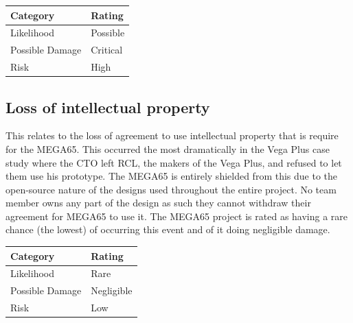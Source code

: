 \begin{tabular}{l|l} %
    	\textbf{Category} 	&	\textbf{Rating} \\
      \hline
     Likelihood			&	Possible \\
     Possible Damage 	& 	Critical \\
     Risk 				&	High		\\	
    \end{tabular}


\subsection{Loss of intellectual property}
This relates to the loss of agreement to use intellectual property that is require for the MEGA65. This occurred the most dramatically in the Vega Plus case study where the CTO left RCL, the makers of the Vega Plus, and refused to let them use his prototype. The MEGA65 is entirely shielded from this due to the open-source nature of the designs used throughout the entire project. No team member owns any part of the design as such they cannot withdraw their agreement for MEGA65 to use it. The MEGA65 project is rated as having a rare chance (the lowest) of occurring this event and of it doing negligible damage.  \\

\begin{tabular}{l|l} %
    	\textbf{Category} 	&	\textbf{Rating} \\
      \hline
     Likelihood			&	Rare \\
     Possible Damage 	& 	Negligible \\
     Risk 				&	Low		\\	
    \end{tabular}


